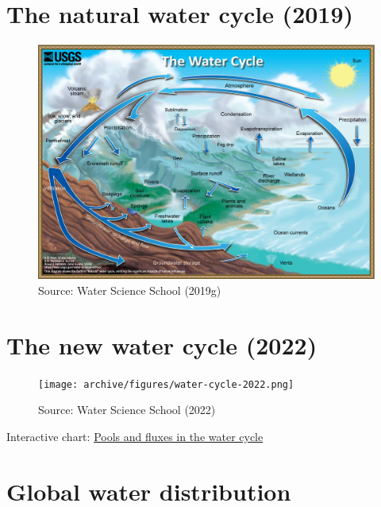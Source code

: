 \documentclass[
  letterpaper,
  DIV=11,
  numbers=noendperiod]{scrreprt}
\begin{document}
\hypertarget{the-natural-water-cycle-2019}{%
\section{The natural water cycle
(2019)}\label{the-natural-water-cycle-2019}}

\begin{figure}

{\centering \includegraphics{archive/figures/water-cycle.jpg}

}

\caption{Source: Water Science School (2019g)}

\end{figure}

\hypertarget{the-new-water-cycle-2022}{%
\section{The new water cycle (2022)}\label{the-new-water-cycle-2022}}

\begin{figure}

{\centering \texttt{[image: archive/figures/water-cycle-2022.png]}

}

\caption{Source: Water Science School (2022)}

\end{figure}

Interactive chart:
\href{https://labs.waterdata.usgs.gov/visualizations/pools-and-fluxes/index.html}{Pools
and fluxes in the water cycle}

\hypertarget{global-water-distribution}{%
\section{Global water distribution}\label{global-water-distribution}}
\end{document}
